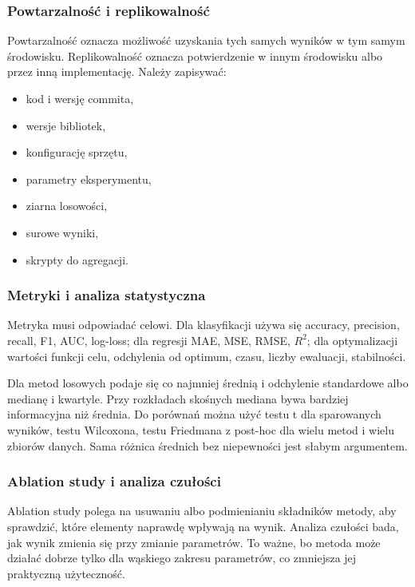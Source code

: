 \subsubsection{Powtarzalność i replikowalność}

Powtarzalność oznacza możliwość uzyskania tych samych wyników w tym samym środowisku. Replikowalność oznacza potwierdzenie w innym środowisku albo przez inną implementację. Należy zapisywać:
\begin{itemize}
  \item kod i wersję commita,
  \item wersje bibliotek,
  \item konfigurację sprzętu,
  \item parametry eksperymentu,
  \item ziarna losowości,
  \item surowe wyniki,
  \item skrypty do agregacji.
\end{itemize}

\subsubsection{Metryki i analiza statystyczna}

Metryka musi odpowiadać celowi. Dla klasyfikacji używa się accuracy, precision, recall, F1, AUC, log-loss; dla regresji MAE, MSE, RMSE, $R^2$; dla optymalizacji wartości funkcji celu, odchylenia od optimum, czasu, liczby ewaluacji, stabilności.

Dla metod losowych podaje się co najmniej średnią i odchylenie standardowe albo medianę i kwartyle. Przy rozkładach skośnych mediana bywa bardziej informacyjna niż średnia. Do porównań można użyć testu t dla sparowanych wyników, testu Wilcoxona, testu Friedmana z post-hoc dla wielu metod i wielu zbiorów danych. Sama różnica średnich bez niepewności jest słabym argumentem.

\subsubsection{Ablation study i analiza czułości}

Ablation study polega na usuwaniu albo podmienianiu składników metody, aby sprawdzić, które elementy naprawdę wpływają na wynik. Analiza czułości bada, jak wynik zmienia się przy zmianie parametrów. To ważne, bo metoda może działać dobrze tylko dla wąskiego zakresu parametrów, co zmniejsza jej praktyczną użyteczność.

